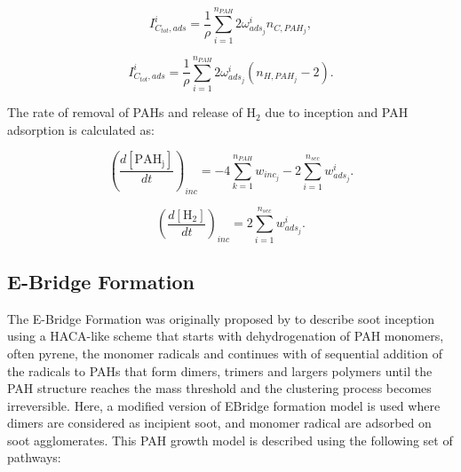 \begin{equation}
	I^i_{C_{tot},ads} =
	\frac{1}{\rho}
	\sum_{i=1}^{n_{PAH}}
	2\omega^i_{ads_j}
	n_{C,PAH_j}
	\label{eqn:ICtotads_dimcoal},
\end{equation}

\begin{equation}
	I^i_{C_{tot},ads} =
	\frac{1}{\rho}
	\sum_{i=1}^{n_{PAH}}
	2\omega^i_{ads_j}
	\left(n_{H,PAH_j}-2\right)
	\label{eqn:IHtotads_dimcoal}.
\end{equation}

The rate of removal of PAHs and release of $\mathrm{H_2}$ due to inception and PAH adsorption is calculated as:

\begin{equation}
	\left(
		\frac{d\left[{\mathrm{PAH_j}}\right]}{dt}
	\right)_{inc}
	= 
	-4\sum_{k=1}^{n_{PAH}}w_{inc_{j}}-2\sum_{i=1}^{n_{sec}}w^i_{ads_j}
	\label{eqn:PAHscrub_dimcoal}.
\end{equation}

\begin{equation}
	\left(
		\frac{d\left[{\mathrm{H_2}}\right]}{dt}
	\right)_{inc}
	= 
	2\sum_{i=1}^{n_{sec}}w^i_{ads_j}
	\label{eqn:H2scrub_dimcoal}.
\end{equation}

\subsection{E-Bridge Formation}
The E-Bridge Formation was originally proposed by \citet{frenklach2020mechanism} to describe soot inception using a HACA-like scheme that starts with dehydrogenation of PAH monomers, often pyrene, the monomer radicals and continues with of sequential addition of the radicals to PAHs that form dimers, trimers and largers polymers until the PAH structure reaches the mass threshold and the clustering process becomes irreversible. Here, a modified version of EBridge formation model is used where dimers are considered as incipient soot, and monomer radical are adsorbed on soot agglomerates. This PAH growth model is described using the following set of pathways:




